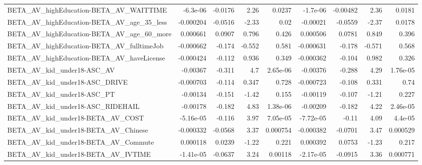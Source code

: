 \begin{tabular}{lrrrrrrrr}
BETA\_AV\_highEducation-BETA\_AV\_WAITTIME             &    -6.3e-06 &      -0.0176 &     2.26 &   0.0237 &   -1.7e-06 &    -0.00482 &         2.36 &        0.0181 \\
BETA\_AV\_highEducation-BETA\_AV\_age\_35\_less          &   -0.000204 &      -0.0516 &    -2.33 &     0.02 &   -0.00021 &     -0.0559 &        -2.37 &        0.0178 \\
BETA\_AV\_highEducation-BETA\_AV\_age\_60\_more          &    0.000661 &       0.0907 &    0.796 &    0.426 &   0.000506 &      0.0781 &        0.849 &         0.396 \\
BETA\_AV\_highEducation-BETA\_AV\_fulltimeJob          &   -0.000662 &       -0.174 &   -0.552 &    0.581 &  -0.000631 &      -0.178 &       -0.571 &         0.568 \\
BETA\_AV\_highEducation-BETA\_AV\_haveLicense          &   -0.000424 &       -0.112 &    0.936 &    0.349 &  -0.000362 &      -0.104 &        0.982 &         0.326 \\
BETA\_AV\_kid\_under18-ASC\_AV                         &    -0.00367 &       -0.311 &      4.7 & 2.65e-06 &   -0.00376 &      -0.288 &         4.29 &      1.76e-05 \\
BETA\_AV\_kid\_under18-ASC\_DRIVE                      &   -0.000703 &       -0.114 &    0.347 &    0.728 &  -0.000723 &      -0.108 &        0.331 &          0.74 \\
BETA\_AV\_kid\_under18-ASC\_PT                         &    -0.00134 &       -0.151 &    -1.42 &    0.155 &   -0.00119 &      -0.107 &        -1.21 &         0.227 \\
BETA\_AV\_kid\_under18-ASC\_RIDEHAIL                   &    -0.00178 &       -0.182 &     4.83 & 1.38e-06 &   -0.00209 &      -0.182 &         4.22 &      2.46e-05 \\
BETA\_AV\_kid\_under18-BETA\_AV\_COST                   &   -5.16e-05 &       -0.116 &     3.97 & 7.05e-05 &  -7.72e-05 &       -0.11 &         4.09 &       4.4e-05 \\
BETA\_AV\_kid\_under18-BETA\_AV\_Chinese                &   -0.000332 &      -0.0568 &     3.37 & 0.000754 &  -0.000382 &     -0.0701 &         3.47 &      0.000529 \\
BETA\_AV\_kid\_under18-BETA\_AV\_Commute                &    0.000118 &       0.0239 &    -1.22 &    0.221 &   0.000392 &      0.0753 &        -1.23 &         0.217 \\
BETA\_AV\_kid\_under18-BETA\_AV\_IVTIME                 &   -1.41e-05 &      -0.0637 &     3.24 &  0.00118 &  -2.17e-05 &     -0.0915 &         3.36 &      0.000771 \\

\end{tabular}
